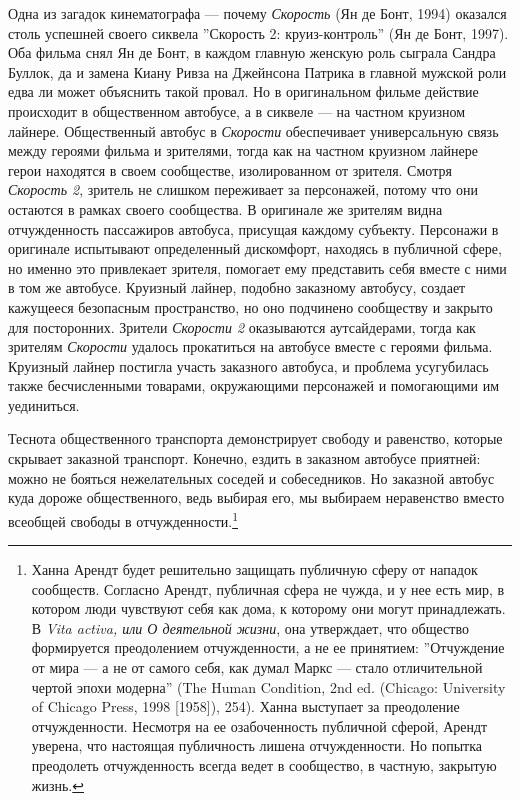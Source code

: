 \documentclass[12pt]{book}
\begin{document}
Одна из загадок кинематографа --- почему \textit{Скорость} (Ян де Бонт, 1994) оказался столь успешней своего сиквела ''Скорость 2: круиз-контроль'' (Ян де Бонт, 1997). Оба фильма снял Ян де Бонт, в каждом главную женскую роль сыграла Сандра Буллок, да и замена Киану Ривза на Джейнсона Патрика в главной мужской роли едва ли может объяснить такой провал. Но в оригинальном фильме действие происходит в общественном автобусе, а в сиквеле --- на частном круизном лайнере. Общественный автобус в \textit{Скорости} обеспечивает универсальную связь между героями фильма и зрителями, тогда как на частном круизном лайнере герои находятся в своем сообществе, изолированном от зрителя. Смотря \textit{Скорость 2}, зритель не слишком переживает за персонажей, потому что они остаются в рамках своего сообщества. В оригинале же зрителям видна отчужденность пассажиров автобуса, присущая каждому субъекту. Персонажи в оригинале испытывают определенный дискомфорт, находясь в публичной сфере, но именно это привлекает зрителя, помогает ему представить себя вместе с ними в том же автобусе. Круизный лайнер, подобно заказному автобусу, создает кажущееся безопасным пространство, но оно подчинено сообществу и закрыто для посторонних. Зрители \textit{Скорости 2} оказываются аутсайдерами, тогда как зрителям \textit{Скорости} удалось прокатиться на автобусе вместе с героями фильма. Круизный лайнер постигла участь заказного автобуса, и проблема усугубилась также бесчисленными товарами, окружающими персонажей и помогающими им уединиться.

Теснота общественного транспорта демонстрирует свободу и равенство, которые скрывает заказной транспорт. Конечно, ездить в заказном автобусе приятней: можно не бояться нежелательных соседей и собеседников. Но заказной автобус куда дороже общественного, ведь выбирая его, мы выбираем неравенство вместо всеобщей свободы в отчужденности.\footnote{Ханна Арендт будет решительно защищать публичную сферу от нападок сообществ. Согласно Арендт, публичная сфера не чужда, и у нее есть мир, в котором люди чувствуют себя как дома, к которому они могут принадлежать. В \textit{Vita activa, или О деятельной жизни}, она утверждает, что общество формируется преодолением отчужденности, а не ее принятием: ''Отчуждение от мира --- а не от самого себя, как думал Маркс --- стало отличительной чертой эпохи модерна'' (The Human Condition, 2nd ed. (Chicago: University of Chicago Press, 1998 [1958]), 254). Ханна выступает за преодоление отчужденности. Несмотря на ее озабоченность публичной сферой, Арендт уверена, что настоящая публичность лишена отчужденности. Но попытка преодолеть отчужденность всегда ведет в сообщество, в частную, закрытую жизнь.}
\end{document}
